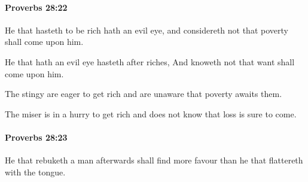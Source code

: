 		\paragraph{Proverbs 28:22} %
			\label{PROVERBS-28-22}

			He that hasteth to be rich hath an evil eye, and considereth not that poverty shall come upon him.

			\begin{versebox}
					\item[BHS] 
					\item[ASV] He that hath an evil eye hasteth after riches, And knoweth not that want shall come upon him.
					\item[NIV] The stingy are eager to get rich and are unaware that poverty awaits them.
					\item[NRSV] The miser is in a hurry to get rich and does not know that loss is sure to come.
			\end{versebox}

		\paragraph{Proverbs 28:23} %
			\label{PROVERBS-28-23}

			He that rebuketh a man afterwards shall find more favour than he that flattereth with the tongue.

